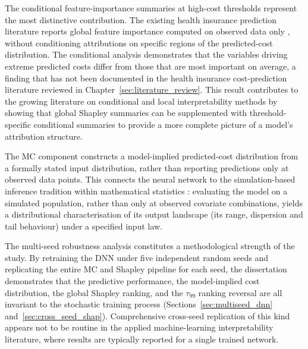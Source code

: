 The conditional feature-importance summaries at high-cost thresholds
represent the most distinctive contribution.  The existing health
insurance prediction literature reports global feature importance computed
on observed data only \citep{kaushik2022machine, rozemberczki2022shapley},
without conditioning attributions on specific regions of the predicted-cost
distribution.  The conditional analysis demonstrates that the variables
driving extreme predicted costs differ from those that are most important
on average, a finding that has not been documented in the health insurance
cost-prediction literature reviewed in
Chapter~\ref{sec:literature_review}.  This result contributes to the
growing literature on conditional and local interpretability methods
\citep{lundberg2017unified} by showing that global Shapley summaries can
be supplemented with threshold-specific conditional summaries to provide a
more complete picture of a model's attribution structure.

The MC component constructs a model-implied predicted-cost
distribution from a formally stated input distribution, rather than
reporting predictions only at observed data points.  This connects the
neural network to the simulation-based inference tradition within
mathematical statistics \citep{glasserman2004monte,
rubinstein2016simulation, robert2004monte}: evaluating the model on a
simulated population, rather than only at observed covariate combinations,
yields a distributional characterisation of its output landscape (its
range, dispersion and tail behaviour) under a specified input law.

The multi-seed robustness analysis constitutes a methodological
strength of the study.
By retraining the DNN under five independent random seeds and
replicating the entire MC and Shapley pipeline for each seed,
the dissertation demonstrates that the predictive performance, the
model-implied cost distribution, the global Shapley ranking, and the
$\tau_{99}$ ranking reversal are all invariant to the stochastic
training process (Sections~\ref{sec:multiseed_dnn}
and~\ref{sec:cross_seed_shap}).  Comprehensive cross-seed replication
of this kind appears not to be routine in the applied machine-learning
interpretability literature, where results are typically reported for a
single trained network.

